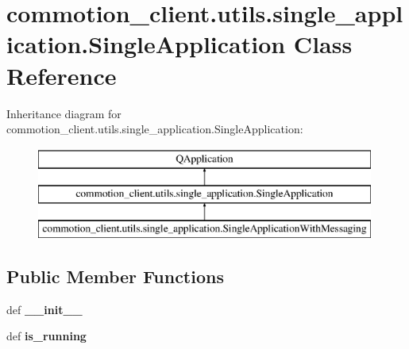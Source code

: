 \hypertarget{classcommotion__client_1_1utils_1_1single__application_1_1SingleApplication}{\section{commotion\+\_\+client.\+utils.\+single\+\_\+application.\+Single\+Application Class Reference}
\label{classcommotion__client_1_1utils_1_1single__application_1_1SingleApplication}
}
Inheritance diagram for commotion\+\_\+client.\+utils.\+single\+\_\+application.\+Single\+Application\+:\begin{figure}[H]
\begin{center}
\leavevmode
\includegraphics[height=3.000000cm]{classcommotion__client_1_1utils_1_1single__application_1_1SingleApplication}
\end{center}
\end{figure}
\subsection*{Public Member Functions}
\begin{DoxyCompactItemize}
\item 
\hypertarget{classcommotion__client_1_1utils_1_1single__application_1_1SingleApplication_a5d403bbba596b540b6ecb580205111b5}{def {\bfseries \+\_\+\+\_\+init\+\_\+\+\_\+}}\label{classcommotion__client_1_1utils_1_1single__application_1_1SingleApplication_a5d403bbba596b540b6ecb580205111b5}

\item 
\hypertarget{classcommotion__client_1_1utils_1_1single__application_1_1SingleApplication_acf757577a5b8729d162c828275e1b948}{def {\bfseries is\+\_\+running}}\label{classcommotion__client_1_1utils_1_1single__application_1_1SingleApplication_acf757577a5b8729d162c828275e1b948}

\end{DoxyCompactItemize}
